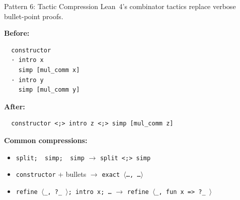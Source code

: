 \documentclass[aspectratio=169,10pt]{beamer}
\begin{document}
\begin{frame}[fragile]{Pattern 6: Tactic Compression}
    \vspace{-0.3em}
    Lean~4's combinator tactics replace verbose bullet-point proofs.

    \vspace{0.4em}
    \textbf{\textcolor{softred}{Before:}}
    \begin{lstlisting}
  constructor
  · intro x
    simp [mul_comm x]
  · intro y
    simp [mul_comm y]
    \end{lstlisting}

    \textbf{\textcolor{leangreen}{After:}}
    \begin{lstlisting}
  constructor <;> intro z <;> simp [mul_comm z]
    \end{lstlisting}

    \vspace{0.4em}
    {\small
    \textbf{Common compressions:}
    \begin{itemize}\itemsep0.1em
        \item \texttt{split; \textbullet\ simp; \textbullet\ simp} $\to$ \texttt{split <;> simp}
        \item \texttt{constructor} + bullets $\to$ \texttt{exact $\langle$\ldots, \ldots$\rangle$}
        \item \texttt{refine $\langle$\_, ?\_ $\rangle$; intro x; \ldots} $\to$ \texttt{refine $\langle$\_, fun x => ?\_ $\rangle$}
    \end{itemize}
    }
\end{frame}
\end{document}
